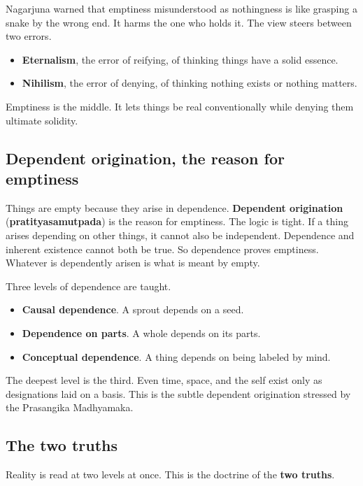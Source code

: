 Nagarjuna warned that emptiness misunderstood as nothingness is like grasping a snake by the wrong end. It harms the one who holds it. The view steers between two errors.

\begin{itemize}
 \item \textbf{Eternalism}, the error of reifying, of thinking things have a solid essence.
 \item \textbf{Nihilism}, the error of denying, of thinking nothing exists or nothing matters.
\end{itemize}

Emptiness is the middle. It lets things be real conventionally while denying them ultimate solidity.

\subsection*{Dependent origination, the reason for emptiness}

Things are empty because they arise in dependence. \textbf{Dependent origination} (\textbf{pratityasamutpada}) is the reason for emptiness. The logic is tight. If a thing arises depending on other things, it cannot also be independent. Dependence and inherent existence cannot both be true. So dependence proves emptiness. Whatever is dependently arisen is what is meant by empty.

Three levels of dependence are taught.

\begin{itemize}
 \item \textbf{Causal dependence}. A sprout depends on a seed.
 \item \textbf{Dependence on parts}. A whole depends on its parts.
 \item \textbf{Conceptual dependence}. A thing depends on being labeled by mind.
\end{itemize}

The deepest level is the third. Even time, space, and the self exist only as designations laid on a basis. This is the subtle dependent origination stressed by the Prasangika Madhyamaka.

\subsection*{The two truths}

Reality is read at two levels at once. This is the doctrine of the \textbf{two truths}.

